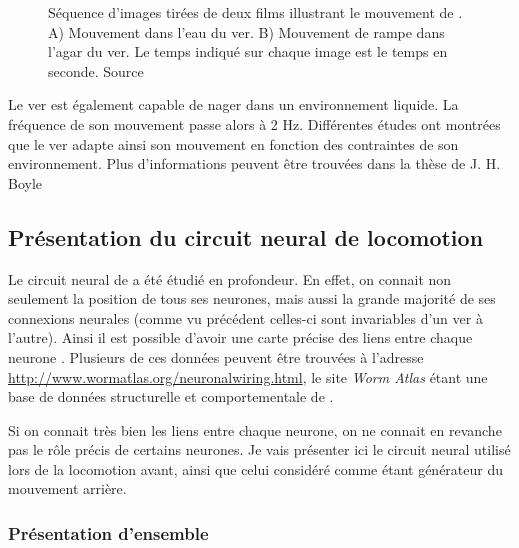 \begin{figure}[ht]
   \begin{center}
   \end{center}
   \caption[Séquence d'image du mouvement de \celeg{}]{Séquence d'images tirées de deux films illustrant le mouvement de
   \celeg{}. A) Mouvement dans l'eau du ver. B) Mouvement de rampe dans l'agar du ver. Le
   temps indiqué sur chaque image est le temps en seconde. Source \boylecite{}}
   \label{fig:celegans_mouvement}
\end{figure}

Le ver est également capable de nager dans un environnement liquide. La fréquence
de son mouvement passe alors à 2 Hz. Différentes études ont montrées que le ver
adapte ainsi son mouvement en fonction des contraintes de son environnement.
Plus d'informations peuvent être trouvées dans la thèse de J. H. Boyle \cite{Boyle2009}


\subsection{Présentation du circuit neural de locomotion} %
\label{sub:Présentation du circuit neural de locomotion}

Le circuit neural de \celeg{} a été étudié en profondeur. En effet, on connait
non seulement la position de tous ses neurones, mais aussi la grande majorité
de ses connexions neurales (comme vu précédent celles-ci sont invariables d'un
ver à l'autre).  Ainsi il est possible d'avoir une carte précise des liens
entre chaque neurone \cite{Durbin1987,Chen2006,Boyle2009,Varshney2011}.
Plusieurs de ces données peuvent être trouvées à l'adresse
\url{http://www.wormatlas.org/neuronalwiring.html}, le site \textit{Worm Atlas}
étant une base de données structurelle et comportementale de \celeg{}.

Si on connait très bien les liens entre chaque neurone, on ne connait en
revanche pas le rôle précis de certains neurones. Je vais présenter ici le
circuit neural utilisé lors de la locomotion avant, ainsi que celui
considéré comme étant générateur du mouvement arrière.

\subsubsection{Présentation d'ensemble} %
\label{ssub:Présentation d'ensemble}

